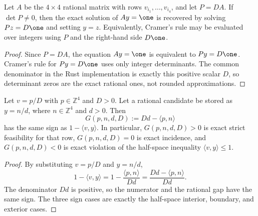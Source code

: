 \begin{lemma}
\label{lem:integer-scaled-polar-candidates}
Let $A$ be the $4 \times 4$ rational matrix with rows $v_{i_1},\ldots,v_{i_4}$,
and let $P = DA$.  If $\det P \neq 0$, then the exact solution of
$Ay=\one$ is recovered by solving $Pz=D\one$ and setting $y=z$.
Equivalently, Cramer's rule may be evaluated over integers using $P$ and the
right-hand side $D\one$.
\end{lemma}

\begin{proof}
Since $P=DA$, the equation $Ay=\one$ is equivalent to $Py=D\one$.  Cramer's
rule for $Py=D\one$ uses only integer determinants.  The common denominator in
the Rust implementation is exactly this positive scalar $D$, so determinant
zeros are the exact rational ones, not rounded approximations.
\end{proof}

\begin{lemma}
\label{lem:integer-scaled-feasibility-gap}
Let $v=p/D$ with $p\in\mathbb{Z}^4$ and $D>0$.  Let a rational candidate be
stored as $y=n/d$, where $n\in\mathbb{Z}^4$ and $d>0$.  Then
\[
  G(p,n,d,D) := Dd-\langle p,n\rangle
\]
has the same sign as $1-\langle v,y\rangle$.  In particular,
$G(p,n,d,D) > 0$ is exact strict feasibility for that row,
$G(p,n,d,D) = 0$ is exact incidence, and $G(p,n,d,D) < 0$ is exact violation
of the half-space inequality $\langle v,y\rangle \le 1$.
\end{lemma}

\begin{proof}
By substituting $v=p/D$ and $y=n/d$,
\[
  1-\langle v,y\rangle
  =
  1-\frac{\langle p,n\rangle}{Dd}
  =
  \frac{Dd-\langle p,n\rangle}{Dd}.
\]
The denominator $Dd$ is positive, so the numerator and the rational gap have
the same sign.  The three sign cases are exactly the half-space interior,
boundary, and exterior cases.
\end{proof}
